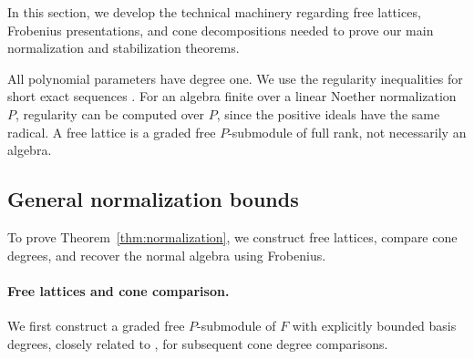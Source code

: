\documentclass[12pt]{amsart}
\numberwithin{equation}{section}
\theoremstyle{definition}
\theoremstyle{remark}
\numberwithin{equation}{section}
\begin{document}
In this section, we develop the technical machinery regarding free lattices, Frobenius presentations, and cone decompositions needed to prove our main normalization and stabilization theorems.

All polynomial parameters have degree one. We use the regularity inequalities for short exact sequences \cite{CFN, Eis}. For an algebra finite over a linear Noether normalization $P$, regularity can be computed over $P$, since the positive ideals have the same radical. A free lattice is a graded free $P$-submodule of full rank, not necessarily an algebra.

\subsection{General normalization bounds}
\label{subsec:general-normalization}
To prove Theorem~\ref{thm:normalization}, we construct free lattices, compare cone degrees, and recover the normal algebra using Frobenius.

\paragraph{\textbf{Free lattices and cone comparison.}}
We first construct a graded free $P$-submodule of $F$ with explicitly bounded basis degrees, closely related to \cite[Proposition 5.3]{DV}, for subsequent cone degree comparisons.
\end{document}
